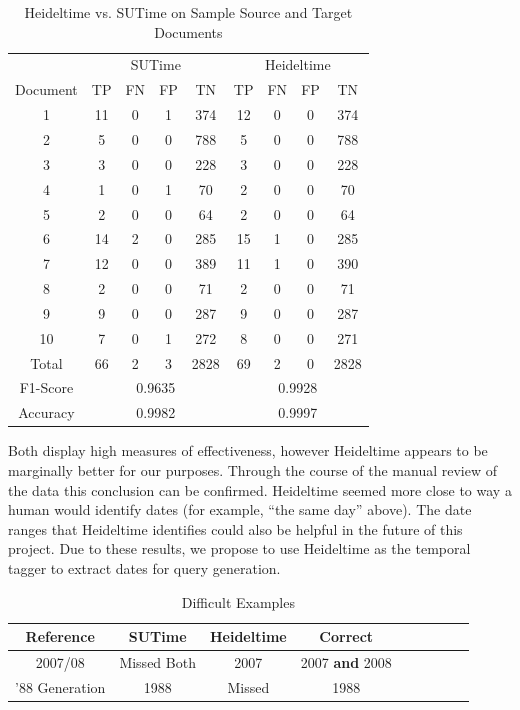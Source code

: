 \documentclass{mprop}
\begin{document}
\begin{table}[H]
\centering
\begin{tabular}{|c|c|c|c|c|c|c|c|c|}
\hline
& \multicolumn{4}{|c|}{SUTime}    & \multicolumn{4}{|c|}{Heideltime} \\ 
\cline{2-9}
Document & TP  & FN & FP & TN     & TP & FN & FP & TN    \\ \hline
1        & 11  & 0  & 1  & 374	  & 12 & 0  & 0  & 374   \\ \hline
2        & 5   & 0  & 0	 & 788 	  & 5  & 0  & 0  & 788   \\ \hline
3		 & 3   & 0  & 0  & 228	  & 3  & 0  & 0  & 228 	 \\ \hline
4        & 1   & 0  & 1	 & 70  	  & 2  & 0  & 0  & 70  	 \\ \hline
5	     & 2   & 0  & 0	 & 64     & 2  & 0  & 0  & 64    \\ \hline
6		 & 14  & 2  & 0	 & 285 	  & 15 & 1  & 0  & 285   \\ \hline
7		 & 12  & 0  & 0	 & 389 	  & 11 & 1  & 0  & 390 	 \\ \hline
8		 & 2   & 0  & 0	 & 71  	  & 2  & 0  & 0  & 71  	 \\ \hline
9		 & 9   & 0  & 0	 & 287 	  & 9  & 0  & 0  & 287 	 \\ \hline
10		 & 7   & 0  & 1	 & 272 	  & 8  & 0  & 0  & 271 	 \\ \hline
Total    & 66  & 2  & 3	 & 2828	  & 69 & 2  & 0  & 2828  \\ \hline
F1-Score & \multicolumn{4}{|c|}{0.9635} & \multicolumn{4}{|c|}{0.9928} \\ \hline
Accuracy & \multicolumn{4}{|c|}{0.9982} & \multicolumn{4}{|c|}{0.9997} \\ \hline
\end{tabular}
\caption{Heideltime vs. SUTime on Sample Source and Target Documents}
\label{temporalcomparison}
\end{table}
Both display high measures of effectiveness, however Heideltime appears to be marginally better for our purposes. 
Through the course of the manual review of the data this conclusion can be confirmed. 
Heideltime seemed more close to way a human would identify dates (for example, ``the same day'' above). 
The date ranges that Heideltime identifies could also be helpful in the future of this project. 
Due to these results, we propose to use Heideltime as the temporal tagger to extract dates for query generation.

\begin{table}[H]
\centering
\begin{tabular}{|c|c|c|c|c|c|c|c|c|}
\hline
Reference      & SUTime          & Heideltime  & Correct                \\ \hline
2007/08		   & Missed Both     & 2007        & 2007 \textbf{and} 2008 \\ \hline
'88 Generation & 1988            & Missed 	   & 1988  	   	            \\ \hline
\end{tabular}
\caption{Difficult Examples}
\label{temporalcomparison}
\end{table}
\end{document}
